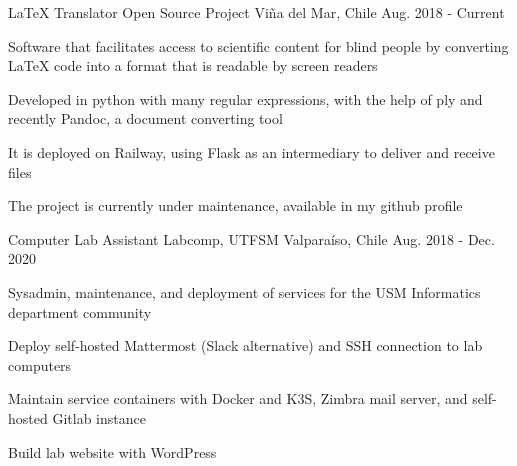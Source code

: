 \begin{cventries}
  \cventry
    {LaTeX Translator} %
    {Open Source Project} %
    {Viña del Mar, Chile} %
    {Aug. 2018 - Current} %
    {
      \begin{cvitems} %
        \item {Software that facilitates access to scientific content for blind people by converting LaTeX code into a format that is readable by screen readers}
        \item {Developed in python with many regular expressions, with the help of ply and recently Pandoc, a document converting tool}
        \item {It is deployed on Railway, using Flask as an intermediary to deliver and receive files}
        \item {The project is currently under maintenance, available in my github profile}
      \end{cvitems}
    }

  \cventry
    {Computer Lab Assistant} %
    {Labcomp, UTFSM} %
    {Valparaíso, Chile} %
    {Aug. 2018 - Dec. 2020} %
    {
      \begin{cvitems} %
        \item {Sysadmin, maintenance, and deployment of services for the USM Informatics department community}
        \item {Deploy self-hosted Mattermost (Slack alternative) and SSH connection to lab computers}
        \item {Maintain service containers with Docker and K3S, Zimbra mail server, and self-hosted Gitlab instance}
        \item {Build lab website with WordPress}
      \end{cvitems}
    }


\end{cventries}
